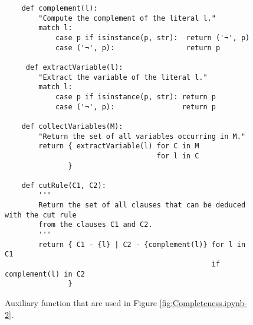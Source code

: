 \begin{figure}[!ht]
\centering
\begin{verbatim}
    def complement(l):
        "Compute the complement of the literal l."
        match l:
            case p if isinstance(p, str):  return ('¬', p)
            case ('¬', p):                 return p

     def extractVariable(l):
        "Extract the variable of the literal l."
        match l:
            case p if isinstance(p, str): return p           
            case ('¬', p):                return p
    
    def collectVariables(M):
        "Return the set of all variables occurring in M."
        return { extractVariable(l) for C in M 
                                    for l in C
               }        
        
    def cutRule(C1, C2):
        '''
        Return the set of all clauses that can be deduced with the cut rule 
        from the clauses C1 and C2.
        '''
        return { C1 - {l} | C2 - {complement(l)} for l in C1
                                                 if  complement(l) in C2
               }
\end{verbatim}
\vspace*{-0.3cm}
\caption{Auxiliary function that are used in Figure \ref{fig:Completeness.ipynb-2}.}
\label{fig:Completeness.ipynb-1}
\end{figure}

